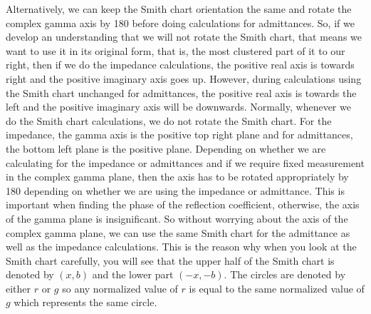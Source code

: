 Alternatively, we can keep the Smith chart orientation the same and rotate the complex gamma axis by 180\textdegree\; before doing calculations for admittances. So, if we develop an understanding that we will not rotate the Smith chart, that means we want to use it in its original form, that is, the most clustered part of it to our right, then if we do the impedance calculations, the positive real axis is towards right and the positive imaginary axis goes up. However, during calculations using the Smith chart unchanged for admittances, the positive real axis is towards the left and the positive imaginary axis will be downwards. Normally, whenever we do the Smith chart calculations, we do not rotate the Smith chart. For the impedance, the gamma axis is the positive top right plane and for admittances, the bottom left plane is the positive plane. Depending on whether we are calculating for the impedance or admittances and if we require fixed measurement in the complex gamma plane, then the axis has to be rotated appropriately by 180\textdegree\; depending on whether we are using the impedance or admittance. This is important when finding the phase of the reflection coefficient, otherwise, the axis of the gamma plane is insignificant. So without worrying about the axis of the complex gamma plane, we can use the same Smith chart for the admittance as well as the impedance calculations. This is the reason why when you look at the Smith chart carefully, you will see that the upper half of the Smith chart is denoted by $(x,b)$ and the lower part $(-x,-b)$. The circles are denoted by either $r$ or $g$ so any normalized value of $r$ is equal to the same normalized value of $g$ which represents the same circle. 

